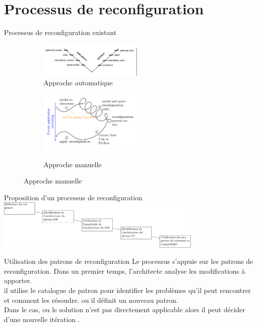 \section{Processus de reconfiguration} 

\begin{frame}{Processus de reconfiguration existant}
\begin{figure}
\begin{subfigure}[b]{0.5\textwidth} %
\includegraphics[width=5cm]{imgs/boyer_protocole}
\caption{Approche automatique}\label{fig:orchid}
\end{subfigure}
\begin{subfigure}[b]{0.5\textwidth} %
\includegraphics[width=5cm]{imgs/buisson_approche}\\
\caption{Approche manuelle}\label{fig:orchid}
\end{subfigure}
\end{figure}
\end{frame}

\begin{frame}{Proposition d'un processus de reconfiguration}
\includegraphics[width=10cm]{imgs/modeling_process}
\end{frame}

\begin{frame}{Utilisation des patrons de reconfiguration}
Le processus s'appuie sur les patrons de reconfiguration. Dans un
premier temps, l'architecte analyse les modifications à apporter.\\

il utilise le catalogue de patron pour identifier les problèmes qu'il
peut rencontrer et comment les résoudre. ou il définit un nouveau
patron. \\

Dans le cas, ou le solution n'est pas directement applicable alors il
peut décider d'une nouvelle itération .
\end{frame}
